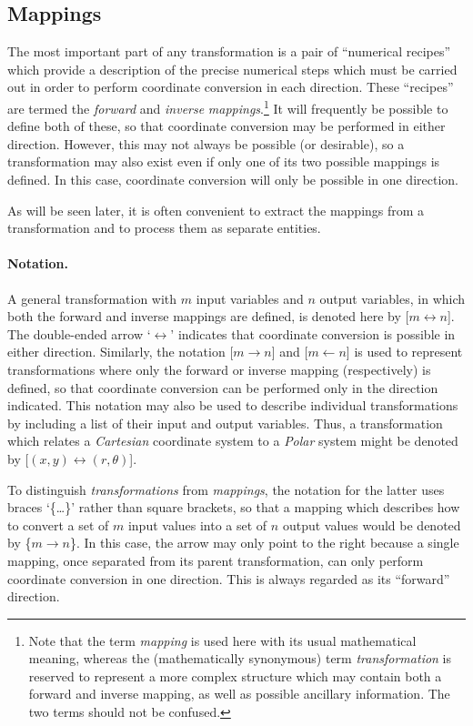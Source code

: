\subsection{Mappings}

The most important part of any transformation is a pair of ``numerical
recipes'' which provide a description of the precise numerical steps which
must be carried out in order to perform coordinate conversion in each
direction. 
These ``recipes'' are termed the {\em forward} and {\em inverse}
{\em mappings}.\footnote{ 
Note that the term {\em mapping} is used here with its usual mathematical 
meaning, whereas the (mathematically synonymous) term {\em transformation} 
is reserved to represent a more complex structure which may contain both a 
forward and inverse mapping, as well as possible ancillary information.
The two terms should not be confused.}
It will frequently be possible to define both of these, so that coordinate
conversion may be performed in either direction. 
However, this may not always be possible (or desirable), so a transformation
may also exist even if only one of its two possible mappings is defined. 
In this case, coordinate conversion will only be possible in one direction. 

As will be seen later, it is often convenient to extract the mappings from
a transformation and to process them as separate entities. 


\paragraph{Notation.}
A general transformation with $m$ input variables and $n$ output variables,
in which both the forward and inverse mappings are defined, is denoted here
by \mbox{[$m \leftrightarrow n$]}. 
The double-ended arrow `$\leftrightarrow$' indicates that coordinate
conversion is possible in either direction. 
Similarly, the notation \mbox{[$m \rightarrow n$]} and \mbox{[$m \leftarrow
n$]} is used to represent transformations where only the forward or inverse
mapping (respectively) is defined, so that coordinate conversion can be
performed only in the direction indicated. 
This notation may also be used to describe individual transformations by
including a list of their input and output variables.
Thus, a transformation which relates a {\em Cartesian} coordinate system to
a {\em Polar} system might be denoted by \mbox{[$(x,y) \leftrightarrow
(r,\theta)$]}. 

To distinguish {\em transformations} from {\em mappings}, the notation for 
the latter uses braces `\{\ldots\}' rather than square brackets, so that a
mapping which describes how to convert a set of $m$ input values into a set
of $n$ output values would be denoted by \mbox{\{$m \rightarrow n$\}}. 
In this case, the arrow may only point to the right because a single
mapping, once separated from its parent transformation, can only perform
coordinate conversion in one direction. 
This is always regarded as its ``forward'' direction. 


